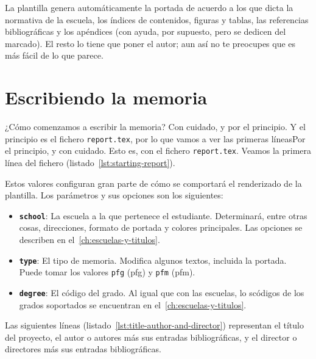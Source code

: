 \documentclass[%
    school=etsisi,%
    type=pfg,%
    degree=61CI,%
]{upm-report}
\begin{document}
La plantilla genera automáticamente la portada de acuerdo a los que
dicta la normativa de la escuela, los índices de contenidos, figuras y
tablas, las referencias bibliográficas y los apéndices (con ayuda, por
supuesto, pero se dedicen del marcado). El resto lo tiene que poner el
autor; aun así no te preocupes que es más fácil de lo que parece.

\chapter{Escribiendo la memoria}

¿Cómo comenzamos a escribir la memoria? Con cuidado, y por el principio.
Y el principio es el fichero \texttt{report.tex}, por lo que vamos a ver
las primeras líneasPor el principio, y con cuidado. Esto es, con el fichero \texttt{report.tex}. Veamos la primera línea del fichero (listado~\ref{lst:starting-report}).



Estos valores configuran gran parte de cómo se comportará el renderizado
de la plantilla. Los parámetros y sus opciones son los siguientes:

\begin{itemize}
    \item \textbf{\texttt{school}}: La escuela a la que pertenece el
        estudiante. Determinará, entre otras cosas, direcciones, formato
        de portada y colores principales. Las opciones se describen en
        el~\autoref{ch:escuelas-y-titulos}.
    \item \textbf{\texttt{type}}: El tipo de memoria. Modifica algunos textos, incluida la portada. Puede tomar los valores \texttt{pfg} (\acrlong{pfg}) y \texttt{pfm}  (\acrlong{pfm}).
    \item \textbf{\texttt{degree}}: El código del grado. Al igual que
    con las escuelas, lo scódigos de los grados soportados se encuentran
    en el~\autoref{ch:escuelas-y-titulos}.
\end{itemize}

Las siguientes líneas (listado~\ref{lst:title-author-and-director})
representan el título del proyecto, el autor o autores más sus entradas
bibliográficas, y el director o directores más sus entradas
bibliográficas.


\end{document}
